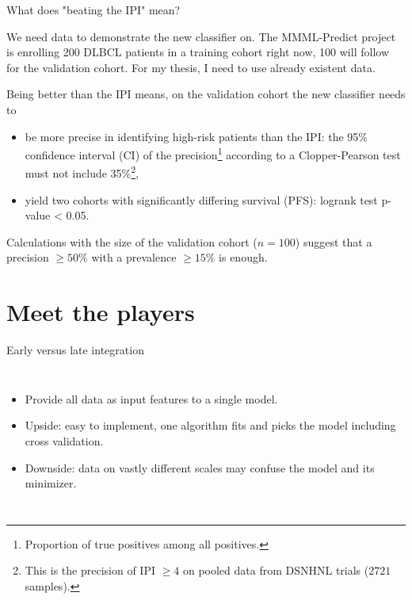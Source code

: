 \documentclass[10pt, aspectratio=169]{beamer}
\begin{document}
\begin{frame}{What does "beating the IPI" mean?}

  We need data to demonstrate the new classifier on. The MMML-Predict project is enrolling \alert{200} DLBCL 
  patients in a \alert{training} cohort right now, \alert{100} will follow for the \alert{validation} cohort. 
  For my thesis, I need to use already existent data.

  Being better than the IPI means, on the validation cohort the new classifier needs to 

  \begin{itemize}
    \item be \alert{more precise in identifying high-risk patients} than the IPI: the 95\% confidence interval (CI) 
    of the precision\footnote{Proportion of true positives among all positives.} according to a Clopper-Pearson test 
    must not include 35\%\footnote{This is the  precision of IPI $\geq 4$ on pooled data from DSNHNL trials 
    ($\num{2721}$ samples).},
    \item yield \alert{two cohorts with significantly differing survival} (PFS): logrank test p-value < 0.05.
  \end{itemize}

  Calculations with the size of the validation cohort ($n = 100$) suggest that a precision $\geq 50\%$ with a 
  prevalence $\geq 15\%$ is enough.
\end{frame}

\section{Meet the players}

\begin{frame}{\alert{Early} versus late integration}
  \begin{columns}
      \centering
      \begin{itemize}
        \item Provide all data as input features to a single model.
        \item Upside: easy to implement, one algorithm fits and picks the model 
          including cross validation.
        \item Downside: data on vastly different scales may confuse the model and 
          its minimizer.
      \end{itemize}
  \end{columns}
\end{frame}
\end{document}
